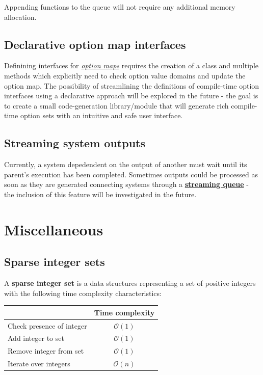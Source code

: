 \documentclass[oneside, 12pt, a4paper, openany]{book}
\begin{document}
Appending functions to the queue will not require any additional memory
allocation.

\section{Declarative option map
interfaces}\label{declarative-option-map-interfaces}

Definining interfaces for
\protect\hyperlink{metaprogramming_option_maps}{\emph{option maps}}
requires the creation of a class and multiple methods which explicitly
need to check option value domains and update the option map. The
possibility of streamlining the definitions of compile-time option
interfaces using a declarative approach will be explored in the future -
the goal is to create a small code-generation library/module that will
generate rich compile-time option sets with an intuitive and safe user
interface.

\section{Streaming system outputs}\label{streaming-system-outputs}

Currently, a system depedendent on the output of another must wait until
its parent's execution has been completed. Sometimes outputs could be
processed as soon as they are generated connecting systems through a
\protect\hyperlink{sys_streamqueue}{\textbf{streaming queue}} - the
inclusion of this feature will be investigated in the future.

\chapter{Miscellaneous}\label{miscellaneous}

\hypertarget{appendix_sparse_integer_sets}{\section{Sparse integer
sets}\label{appendix_sparse_integer_sets}}

A \textbf{sparse integer set} is a data structures representing a set of
positive integers with the following time complexity characteristics:

\begin{longtable}[]{@{}lc@{}}
\toprule
& Time complexity\tabularnewline
\midrule
\endhead
Check presence of integer & \(\mathcal{O}(1)\)\tabularnewline
Add integer to set & \(\mathcal{O}(1)\)\tabularnewline
Remove integer from set & \(\mathcal{O}(1)\)\tabularnewline
Iterate over integers & \(\mathcal{O}(n)\)\tabularnewline
\bottomrule
\end{longtable}
\end{document}

